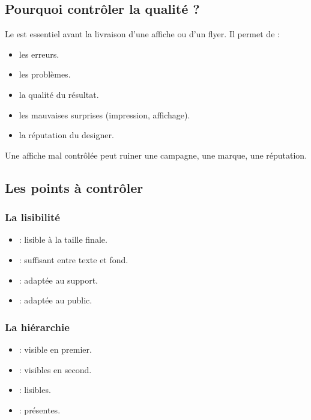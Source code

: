 \subsection{Pourquoi contrôler la qualité ?}

Le  est essentiel avant la livraison d'une affiche ou d'un flyer. Il permet de :

\begin{itemize}
    \item {} les erreurs.
    \item {} les problèmes.
    \item {} la qualité du résultat.
    \item {} les mauvaises surprises (impression, affichage).
    \item {} la réputation du designer.
\end{itemize}

Une affiche mal contrôlée peut ruiner une campagne, une marque, une réputation.

\subsection{Les points à contrôler}

\subsubsection{La lisibilité}

\begin{itemize}
    \item {} : lisible à la taille finale.
    \item {} : suffisant entre texte et fond.
    \item {} : adaptée au support.
    \item {} : adaptée au public.
\end{itemize}

\subsubsection{La hiérarchie}

\begin{itemize}
    \item {} : visible en premier.
    \item {} : visibles en second.
    \item {} : lisibles.
    \item {} : présentes.
\end{itemize}

